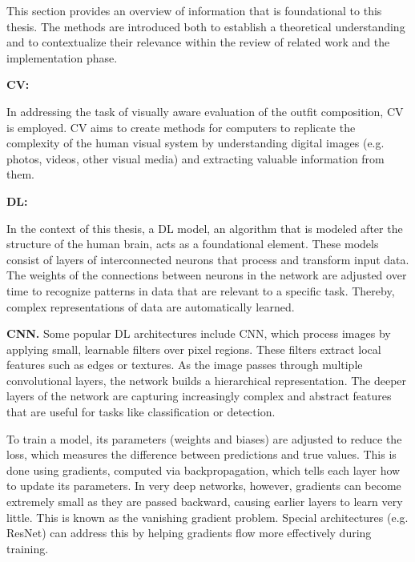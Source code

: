 This section provides an overview of information that is foundational to this thesis. The methods are introduced both to establish a theoretical understanding and to contextualize their relevance within the review of related work and the implementation phase.

\vspace{0.5cm}

\textbf{\ac{CV}:}

\vspace{0.5cm}

In addressing the task of visually aware evaluation of the outfit composition, \acs{CV} is employed. \acs{CV} aims to create methods for computers to replicate the complexity of the human visual system by understanding digital images (e.g. photos, videos, other visual media) and extracting valuable information from them. \cite[cf.]{brownlee_deep_2019}

\vspace{0.5cm}

\textbf{\ac{DL}:}

\vspace{0.5cm}

In the context of this thesis, a \acs{DL} model, an algorithm that is modeled after the structure of the human brain, acts as a foundational element. These models consist of layers of interconnected neurons that process and transform input data. The weights of the connections between neurons in the network are adjusted over time to recognize patterns in data that are relevant to a specific task. Thereby, complex representations of data are automatically learned. \cite[cf.]{muller_introduction_2017}

\vspace{0.5cm}

\textbf{\ac{CNN}.}
Some popular \acs{DL} architectures include \acs{CNN}, which process images by applying small, learnable filters over pixel regions. These filters extract local features such as edges or textures. As the image passes through multiple convolutional layers, the network builds a hierarchical representation. The deeper layers of the network are capturing increasingly complex and abstract features that are useful for tasks like classification or detection. \cite[cf.]{oshea_introduction_2015}

To train a model, its parameters (weights and biases) are adjusted to reduce the loss, which measures the difference between predictions and true values. This is done using gradients, computed via backpropagation, which tells each layer how to update its parameters. In very deep networks, however, gradients can become extremely small as they are passed backward, causing earlier layers to learn very little. This is known as the vanishing gradient problem. Special architectures (e.g. \acs{ResNet}) can address this by helping gradients flow more effectively during training. \cite[cf.]{he_deep_2015} 


